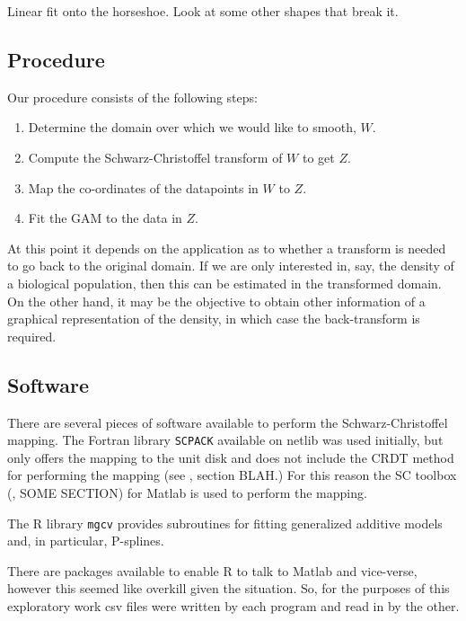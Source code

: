 \documentclass[a4paper,10pt]{amsart}
\newcommand{\sch}{Schwarz-Christoffel }
\begin{document}
Linear fit onto the horseshoe.
Look at some other shapes that break it.



\subsection{Procedure}

Our procedure consists of the following steps:

\begin{enumerate}
\item Determine the domain over which we would like to smooth, $W$.

\item Compute the \sch transform of $W$ to get $Z$.

\item Map the co-ordinates of the datapoints in $W$ to $Z$.

\item Fit the GAM to the data in $Z$.

\end{enumerate}

At this point it depends on the application as to whether a transform is needed to go back to the original domain. If we are only interested in, say, the density of a biological population, then this can be estimated in the transformed domain. On the other hand, it may be the objective to obtain other information of a graphical representation of the density, in which case the back-transform is required.



\subsection{Software}

There are several pieces of software available to perform the \sch mapping. The Fortran library \texttt{SCPACK} available on netlib was used initially, but only offers the mapping to the unit disk and does not include the CRDT method for performing the mapping (see \cite{miller08}, section BLAH.) For this reason the SC toolbox (\cite{driscoll}, SOME SECTION) for Matlab is used to perform the mapping. 

The \textsf{R} library \texttt{mgcv} provides subroutines for fitting generalized additive models and, in particular, P-splines.

There are packages available to enable \textsf{R} to talk to Matlab and vice-verse, however this seemed like overkill given the situation. So, for the purposes of this exploratory work csv files were written by each program and read in by the other.
\end{document}
